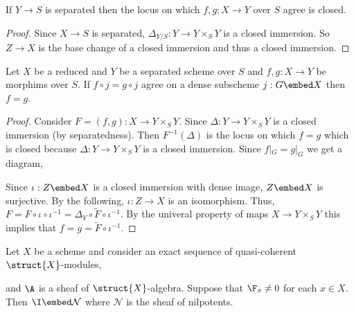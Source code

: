\documentclass[12pt]{article}
\begin{document}
\begin{lemma}
If $Y \to S$ is separated then the locus on which $f,g : X \to Y$ over $S$ agree is closed.
\end{lemma}

\begin{proof}
Since $X \to S$ is separated, $\Delta_{Y/S} : Y \to Y \times_S Y$ is a closed immersion. So $Z \to X$ is the base change of a closed immersion and thus a closed immersion. 
\end{proof}

\begin{lemma}
Let $X$ be a reduced and $Y$ be a separated scheme over $S$ and $f ,g : X \to Y$ be morphims over $S$. If $f \circ j = g \circ j$ agree on a dense subscheme $j : G \embed X$ then $f = g$.
\end{lemma}

\begin{proof}
Consider $F = (f, g) : X \to Y \times_S Y$. Since $\Delta : Y \to Y \times_S Y$ is a closed immersion (by separatedness). Then $F^{-1}(\Delta)$ is the locus on which $f = g$ which is closed because $\Delta : Y \to Y \times_S Y$ is a closed immersion. Since $f|_G = g|_G$ we get a diagram,
\begin{center}
\end{center}
Since $\iota : Z \embed X$ is a closed immersion with dense image, $Z \embed X$ is surjective. By the following, $\iota : Z \to X$ is an isomorphism. Thus, $F = F \circ \iota \circ \iota^{-1} = \Delta_Y \circ \tilde{F} \circ \iota^{-1}$. By the univeral property of maps $X \to Y \times_S Y$ this implies that $f = g = \tilde{F} \circ \iota^{-1}$.
\end{proof}

\newcommand{\Nil}{\mathcal{N}}

\begin{lemma}
Let $X$ be a scheme and consider an exact sequence of quasi-coherent $\struct{X}$-modules,
\begin{center}
\end{center}
and $\A$ is a sheaf of $\struct{X}$-algebra. 
Suppose that $\F_x \neq 0$ for each $x \in X$. Then $\I \embed \Nil$ where $\Nil$ is the sheaf of nilpotents.
\end{lemma}
\end{document}
